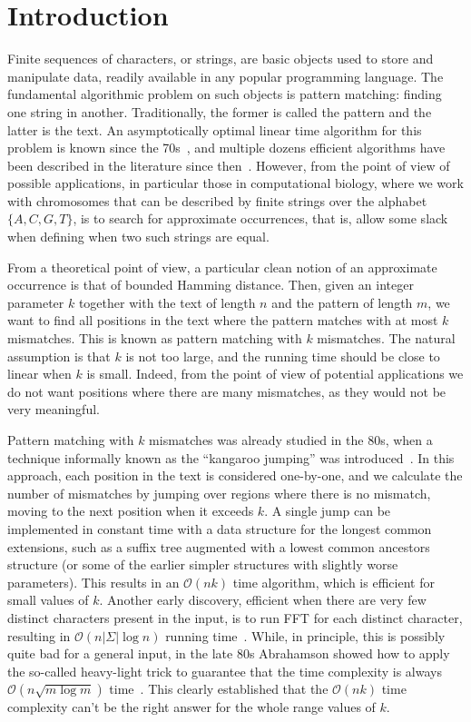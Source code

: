 \documentclass[11pt, letterpaper]{article}
\theoremstyle{plain}
\theoremstyle{definition}
\theoremstyle{remark}
\renewcommand{\O}{\mathcal{O}}
\begin{document}
\section{Introduction}
Finite sequences of characters, or strings, are basic objects used to store and manipulate data, readily available in any popular
programming language. The fundamental algorithmic problem on such objects is pattern matching: finding one string in another.
Traditionally, the former is called the pattern and the latter is the text.
An asymptotically optimal linear time algorithm for this problem is known since the 70s~\cite{Knuth1977}, and multiple dozens
efficient algorithms have been described in the literature since then~\cite{DBLP:books/daglib/0025563}. However, 
from the point of view of possible applications, in particular those in computational biology, where we work with chromosomes
that can be described by finite strings over the alphabet $\{A,C,G,T\}$, is to search for approximate occurrences, that is,
allow some slack when defining when two such strings are equal.

From a theoretical point of view, a particular clean notion of an approximate occurrence is that of bounded Hamming distance.
Then, given an integer parameter $k$ together with the text of length $n$ and the pattern of length $m$, we want to find all
positions in the text where the pattern matches with at most $k$ mismatches. This is known as pattern matching with $k$
mismatches. The natural assumption is that $k$ is not too large,
and the running time should be close to linear when $k$ is small. Indeed, from the point of view of potential applications we do
not want positions where there are many mismatches, as they would not be very meaningful.

Pattern matching with $k$ mismatches was already studied in the 80s, when a technique informally known as
the ``kangaroo jumping'' was introduced~\cite{Landau1986,Galil1986}. In this approach,
each position in the text is considered one-by-one, and we calculate the number of mismatches
by jumping over regions where there is no mismatch, moving to the next position when it exceeds $k$.
A single jump can be implemented in constant time with a data structure for the longest common extensions, such
as a suffix tree augmented with a lowest common ancestors structure (or some of the earlier simpler structures with slightly worse
parameters). This results in an $\O(nk)$ time algorithm, which is efficient for small values of $k$.
Another early discovery, efficient when there are very few distinct characters present in the input,
is to run FFT for each distinct character, resulting in $\O(n|\Sigma|\log n)$ running time~\cite{FischerP74}.
While, in principle, this is possibly quite bad for a general input, in the late 80s Abrahamson showed
how to apply the so-called heavy-light trick to guarantee that the time complexity is always
$\O(n \sqrt{m \log m})$ time~\cite{Abrahamson1987}. This clearly established that the $\O(nk)$ time complexity
can't be the right answer for the whole range values of $k$.
\end{document}
